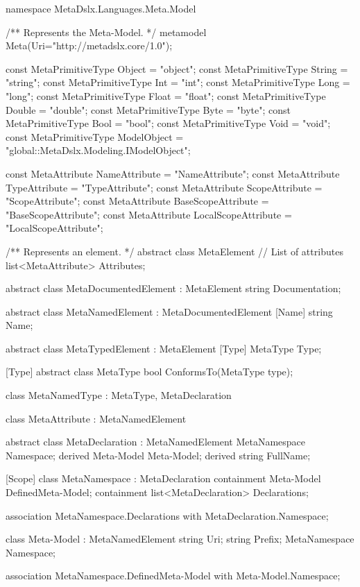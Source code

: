 \documentclass[12pt, a4paper]{report}
\begin{document}
\begin{mmcode}
namespace MetaDslx.Languages.Meta.Model
{
	/**
	Represents the Meta-Model.
	*/
	metamodel Meta(Uri="http://metadslx.core/1.0"); 
	
	const MetaPrimitiveType Object = "object";
	const MetaPrimitiveType String = "string";
	const MetaPrimitiveType Int = "int";
	const MetaPrimitiveType Long = "long";
	const MetaPrimitiveType Float = "float";
	const MetaPrimitiveType Double = "double";
	const MetaPrimitiveType Byte = "byte";
	const MetaPrimitiveType Bool = "bool";
	const MetaPrimitiveType Void = "void";
	const MetaPrimitiveType ModelObject = "global::MetaDslx.Modeling.IModelObject";
	
	const MetaAttribute NameAttribute = "NameAttribute";
	const MetaAttribute TypeAttribute = "TypeAttribute";
	const MetaAttribute ScopeAttribute = "ScopeAttribute";
	const MetaAttribute BaseScopeAttribute = "BaseScopeAttribute";
	const MetaAttribute LocalScopeAttribute = "LocalScopeAttribute";
	
	/**
	Represents an element.
	*/
	abstract class MetaElement
	{
		// List of attributes
		list<MetaAttribute> Attributes; 
	}
	
	abstract class MetaDocumentedElement : MetaElement
	{
		string Documentation;
	}
	
	abstract class MetaNamedElement : MetaDocumentedElement
	{
		[Name]
		string Name;
	}
	
	abstract class MetaTypedElement : MetaElement
	{
		[Type]
		MetaType Type;
	}
	
	[Type]
	abstract class MetaType
	{
		bool ConformsTo(MetaType type);
	}
	
	class MetaNamedType : MetaType, MetaDeclaration
	{
	}
	
	class MetaAttribute : MetaNamedElement
	{
	}
	
	abstract class MetaDeclaration : MetaNamedElement
	{
		MetaNamespace Namespace;
		derived Meta-Model Meta-Model;
		derived string FullName;
	}
	
	[Scope]
	class MetaNamespace : MetaDeclaration
	{
		containment Meta-Model DefinedMeta-Model;
		containment list<MetaDeclaration> Declarations;
	}
	
	association MetaNamespace.Declarations with MetaDeclaration.Namespace;
	
	class Meta-Model : MetaNamedElement
	{
		string Uri;
		string Prefix;
		MetaNamespace Namespace;
	}
	
	association MetaNamespace.DefinedMeta-Model with Meta-Model.Namespace;
	
}
\end{mmcode}
\end{document}
